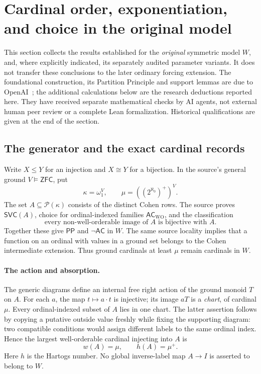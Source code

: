 \section{Cardinal order, exponentiation, and choice in the original model}
\label{sec:complete-cardinals}

This section collects the results established for the \emph{original}
symmetric model $W$, and, where explicitly indicated, its separately audited
parameter variants. It does not transfer these conclusions to the later
ordinary forcing extension. The foundational construction, its Partition
Principle and support lemmas are due to OpenAI~\cite{OpenAI}; the additional
calculations below are the research deductions reported here. They have
received separate mathematical checks by AI agents, not external human peer
review or a complete Lean formalization. Historical qualifications are given
at the end of the section.

\subsection{The generator and the exact cardinal records}

Write $X\leq Y$ for an injection and $X\cong Y$ for a bijection. In the
source's general ground $V\models\mathsf{ZFC}$, put
\[
 \kappa=\omega_1^V,\qquad \mu=((2^{\aleph_0})^+)^V.
\]
The set $A\subseteq\mathcal P(\kappa)$ consists of the distinct Cohen rows.
The source proves $\mathsf{SVC}(A)$, choice for ordinal-indexed families
$\mathsf{AC}_{\mathrm{WO}}$, and the classification
\[
 \text{every non-well-orderable image of $A$ is bijective with $A$}. \tag{Q}
\]
Together these give $\mathsf{PP}$ and $\neg\mathsf{AC}$ in $W$.
The same source locality implies that a function on an ordinal with values
in a ground set belongs to the Cohen intermediate extension. Thus ground
cardinals at least $\mu$ remain cardinals in $W$.

\paragraph{The action and absorption.}
The generic diagrams define an internal free right action of the ground
monoid $T$ on $A$. For each $a$, the map $t\mapsto a\cdot t$ is injective;
its image $aT$ is a \emph{chart}, of cardinal $\mu$. Every ordinal-indexed
subset of $A$ lies in one chart. The latter assertion follows by copying a
putative outside value freshly while fixing the supporting diagram: two
compatible conditions would assign different labels to the same ordinal
index. Hence the largest well-orderable cardinal injecting into $A$ is
\[
                         w(A)=\mu,\qquad h(A)=\mu^+.
\]
Here $h$ is the Hartogs number. No global inverse-label map $A\to I$ is
asserted to belong to $W$.

